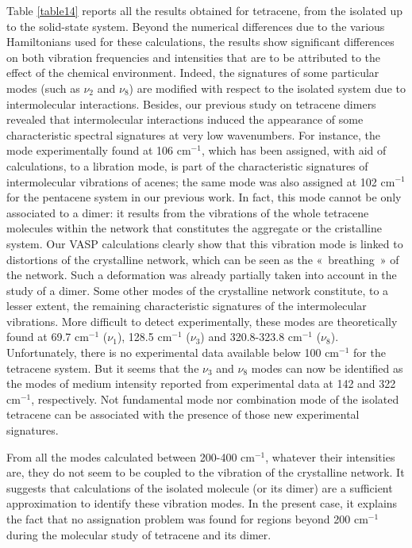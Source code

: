  Table \ref{table14} reports all the results obtained for tetracene, from the isolated up to the solid-state system. Beyond the numerical differences due to the various Hamiltonians used for these calculations, the results show significant differences on both vibration frequencies and intensities that are to be attributed to the effect of the chemical environment. Indeed, the signatures of some particular modes (such as $\nu_{2}$ and $\nu_{8}$) are modified with respect to the isolated system due to intermolecular interactions. Besides, our previous study on tetracene dimers revealed that intermolecular interactions induced the appearance of some characteristic spectral signatures at very low wavenumbers. For instance, the mode experimentally found at 106 cm$^{-1}$, which has been assigned, with aid of calculations, to a libration mode, is part of the characteristic signatures of intermolecular vibrations of acenes; the same mode was also assigned at 102 cm$^{-1}$ for the pentacene system in our previous work. In fact, this mode cannot be only associated to a dimer: it results from the vibrations of the whole tetracene molecules within the network that constitutes the aggregate or the cristalline system. Our VASP calculations clearly show that this vibration mode is linked to distortions of the  crystalline network, which can be seen as the « breathing » of the network. Such a deformation was already partially taken into account in the study of a dimer. Some other modes of the crystalline network constitute, to a lesser extent, the remaining characteristic signatures of the intermolecular vibrations. More difficult to detect experimentally, these modes are theoretically found at 69.7 cm$^{-1}$ ($\nu_{1}$), 128.5 cm$^{-1}$ ($\nu_{3}$) and 320.8-323.8 cm$^{-1}$ ($\nu_{8}$). Unfortunately, there is no experimental data available below 100 cm$^{-1}$ for the tetracene system. But it seems that the $\nu_{3}$ and $\nu_{8}$ modes can now be identified as the modes of medium intensity reported from experimental data at 142 and 322 cm$^{-1}$, respectively. Not fundamental mode nor combination mode of the isolated tetracene can be associated with the presence of those new experimental signatures.
 
 From all the modes calculated between 200-400 cm$^{-1}$, whatever their intensities are, they do not seem to be coupled to the vibration of the crystalline network. It suggests that calculations of the isolated molecule (or its dimer) are a sufficient approximation to identify these vibration modes. In the present case, it explains the fact that no assignation problem was found for regions beyond 200 cm$^{-1}$ during the molecular study of tetracene and its dimer.


